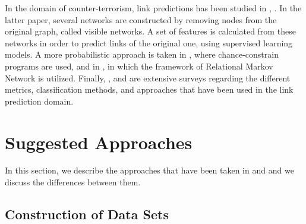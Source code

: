 \documentclass{acm_proc_article-sp}
\begin{document}
In the domain of counter-terrorism, link predictions has been studied in \cite{dombroski2003estimating}, \cite{Fire2013}. In the latter paper, several networks are constructed by removing nodes from the original graph, called visible networks. A set of features is calculated from these networks in order to predict links of the original one, using supervised learning models. A more probabilistic approach is taken in \cite{doppa:nips09-wkshp}, where chance-constrain programs are used, and in \cite{NIPS2003_2465}, in which the framework of Relational Markov Network is utilized. Finally, \cite{DBLP:journals/corr/WangXWZ14}, and \cite{Hasan2011} are extensive surveys regarding the different metrics, classification methods, and approaches that have been used in the link prediction domain. 


\section{Suggested Approaches}
\label{Sect.4}

In this section, we describe the approaches that have been taken in \cite{Hasan06linkprediction} and \cite{Lichtenwalter:2010:NPM:1835804.1835837} and we discuss the differences between them. 

\subsection{Construction of Data Sets}
\end{document}
